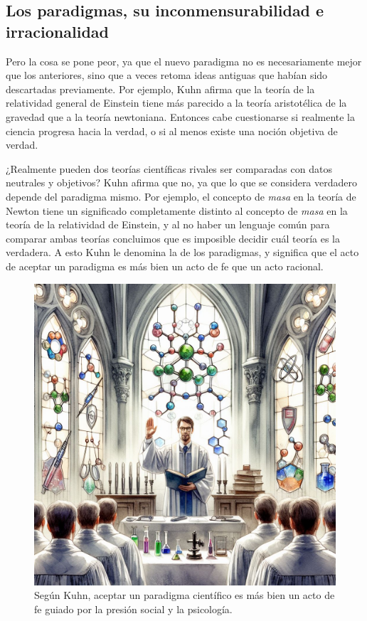 \subsection*{Los paradigmas, su inconmensurabilidad e irracionalidad}
Pero la cosa se pone peor, ya que el nuevo paradigma no es necesariamente mejor
que los anteriores, sino que a veces retoma ideas antiguas que habían sido
descartadas previamente.
Por ejemplo, Kuhn afirma que la teoría de la relatividad general de Einstein
tiene más parecido a la teoría aristotélica de la gravedad que a la teoría
newtoniana.
Entonces cabe cuestionarse si realmente la ciencia progresa hacia la verdad, o
si al menos existe una noción objetiva de verdad.

¿Realmente pueden dos teorías científicas rivales ser comparadas con datos
neutrales y objetivos?
Kuhn afirma que no, ya que lo que se considera verdadero depende del paradigma
mismo.
Por ejemplo, el concepto de \emph{masa} en la teoría de Newton tiene un
significado completamente distinto al concepto de \emph{masa} en la teoría de la
relatividad de Einstein, y al no haber un lenguaje común para comparar ambas
teorías concluimos que es imposible decidir cuál teoría es la verdadera.
A esto Kuhn le denomina la
 de los
paradigmas, y significa que el acto de aceptar un paradigma es más bien un acto
de fe que un acto racional.

\begin{figure}[ht]
    \centering
    \includegraphics[width=0.8\linewidth]{img/actodefe}
    \caption{Según Kuhn, aceptar un paradigma científico es más bien un acto de
        fe guiado por la presión social y la psicología.}
\end{figure}

